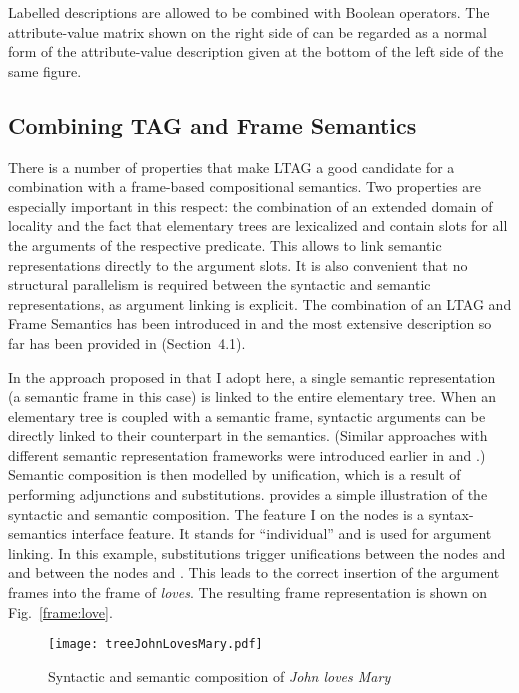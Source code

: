 Labelled descriptions are allowed to be combined with Boolean operators. The attribute-value matrix shown on the right side of  can be regarded as a normal form of the attribute-value description given at the bottom of the left side of the same figure. 

\subsection{Combining TAG and Frame Semantics}
There is a number of properties that make LTAG a good candidate for a combination with a frame-based compositional semantics. Two properties are especially important in this respect: the combination of an extended domain of locality and the fact that elementary trees are lexicalized and contain slots for all the arguments of the respective predicate. This allows to link semantic representations directly to the argument slots. It is also convenient that no structural parallelism is required between the syntactic and semantic representations, as argument linking is explicit. The combination of an LTAG and Frame Semantics has been introduced in \cite{KallmeyerOsswald:12} and the most extensive description so far has been provided in \citealt{KallmeyerOsswald:13} (Section~4.1).

In the approach proposed in \cite{KallmeyerOsswald:13} that I adopt here, a single semantic representation (a semantic frame in this case) is linked to the entire elementary tree. When an elementary tree is coupled with a semantic frame, syntactic arguments can be directly linked to their counterpart in the semantics. (Similar approaches with different semantic representation frameworks were introduced earlier in \cite{GardentKallmeyer:03} and \cite{KallmeyerRomero:08}.) Semantic composition is then modelled by unification, which is a result of performing adjunctions and substitutions.  provides a simple illustration of the syntactic and semantic composition. The feature I on the nodes is a syntax-semantics interface feature. It stands for ``individual'' and is used for argument linking. In this example, substitutions trigger unifications between the nodes  and  and  between the nodes  and . This leads to the correct insertion of the argument frames into the frame of \textit{loves}. The resulting frame representation is shown on Fig.~\ref{frame:love}.
\begin{figure}
	\centering
    \texttt{[image: treeJohnLovesMary.pdf]} 
    \caption{Syntactic and semantic composition of \textit{John loves Mary}}      
    \label{fig:examplesemantic}
\end{figure}

